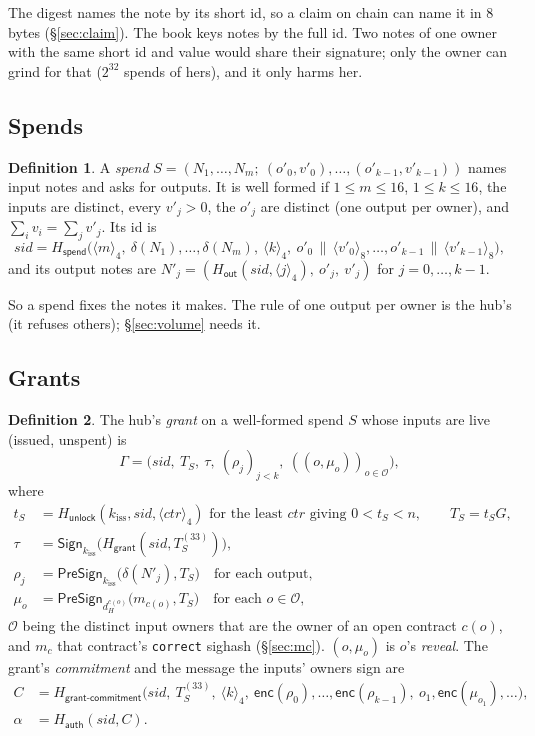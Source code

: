 \documentclass[11pt]{article}
\theoremstyle{plain}
\theoremstyle{definition}
\newtheorem{definition}{Definition}
\newcommand{\tx}[1]{\texttt{#1}}
\newcommand{\cat}{\,\|\,}
\newcommand{\be}[2]{\langle #1\rangle_{#2}}          %
\newcommand{\Ht}[1]{H_{\textsf{#1}}}                 %
\newcommand{\Sign}{\mathsf{Sign}}
\newcommand{\PSign}{\mathsf{PreSign}}
\newcommand{\kiss}{k_{\mathrm{iss}}}
\newcommand{\sid}{\mathit{sid}}
\newcommand{\enc}{\mathsf{enc}}
\begin{document}
The digest names the note by its short id, so a claim on chain can name
it in 8 bytes (\S\ref{sec:claim}). The book keys notes by the full id.
Two notes of one owner with the same short id and value would share
their signature; only the owner can grind for that ($2^{32}$ spends of
hers), and it only harms her.

\subsection{Spends}

\begin{definition}
A \emph{spend} $S = (N_1, \dots, N_m;\ (o'_0, v'_0), \dots, (o'_{k-1},
v'_{k-1}))$ names input notes and asks for outputs. It is well formed if
$1 \le m \le 16$, $1 \le k \le 16$, the inputs are distinct, every $v'_j
> 0$, the $o'_j$ are distinct (one output per owner), and $\sum_i v_i =
\sum_j v'_j$. Its id is
\[
  \sid = \Ht{spend}\big(\be{m}{4},\ \delta(N_1), \dots, \delta(N_m),\
  \be{k}{4},\ o'_0 \cat \be{v'_0}{8}, \dots, o'_{k-1} \cat \be{v'_{k-1}}{8}\big),
\]
and its output notes are $N'_j = (\Ht{out}(\sid, \be{j}{4}),\ o'_j,\ v'_j)$
for $j = 0, \dots, k-1$.
\end{definition}

So a spend fixes the notes it makes. The rule of one output per owner
is the hub's (it refuses others); \S\ref{sec:volume} needs it.

\subsection{Grants}\label{sec:grant}

\begin{definition}
The hub's \emph{grant} on a well-formed spend $S$ whose inputs are live
(issued, unspent) is
\[
  \Gamma = \big(\sid,\ T_S,\ \tau,\ (\rho_j)_{j<k},\ ((o, \mu_o))_{o \in
  \mathcal{O}}\big),
\]
where
\begin{align*}
  t_S &= \Ht{unlock}(\kiss, \sid, \be{\mathit{ctr}}{4}) \text{ for the
  least } \mathit{ctr} \text{ giving } 0 < t_S < n, \qquad T_S = t_SG,\\
  \tau &= \Sign_{\kiss}\big(\Ht{grant}(\sid, T_S^{(33)})\big),\\
  \rho_j &= \PSign_{\kiss}\big(\delta(N'_j), T_S\big)\quad \text{for each output},\\
  \mu_o &= \PSign_{d_H^{c(o)}}\big(m_{c(o)}, T_S\big)\quad \text{for each } o \in \mathcal{O},
\end{align*}
$\mathcal{O}$ being the distinct input owners that are the owner of an
open contract $c(o)$, and $m_{c}$ that contract's \tx{correct} sighash
(\S\ref{sec:mc}). $(o, \mu_o)$ is $o$'s \emph{reveal}. The grant's
\emph{commitment} and the message the inputs' owners sign are
\begin{align*}
  C &= \Ht{grant-commitment}\big(\sid,\ T_S^{(33)},\ \be{k}{4},\
  \enc(\rho_0), \dots, \enc(\rho_{k-1}),\ o_1, \enc(\mu_{o_1}), \dots\big),\\
  \alpha &= \Ht{auth}(\sid, C).
\end{align*}
\end{definition}
\end{document}

